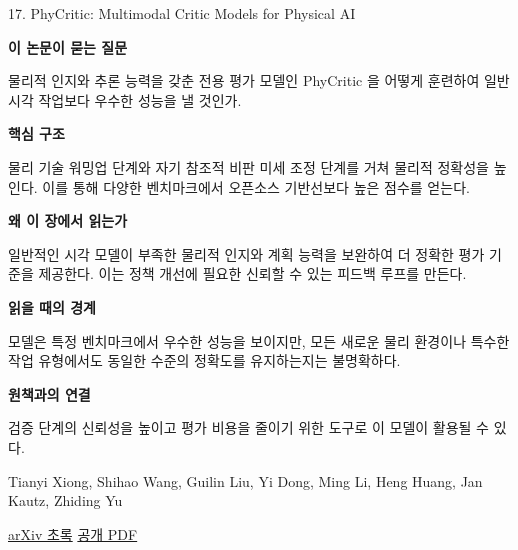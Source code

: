 \documentclass[11pt,openany]{book}
\begin{document}
\begin{termcard}{17. PhyCritic: Multimodal Critic Models for Physical AI}

\par

\medskip

{\sffamily\bfseries\color{deepblue} 이 논문이 묻는 질문}\par

물리적 인지와 추론 능력을 갖춘 전용 평가 모델인 PhyCritic 을 어떻게 훈련하여 일반 시각 작업보다 우수한 성능을 낼 것인가.

\smallskip

{\sffamily\bfseries\color{deepblue} 핵심 구조}\par

물리 기술 워밍업 단계와 자기 참조적 비판 미세 조정 단계를 거쳐 물리적 정확성을 높인다. 이를 통해 다양한 벤치마크에서 오픈소스 기반선보다 높은 점수를 얻는다.

\smallskip

{\sffamily\bfseries\color{deepblue} 왜 이 장에서 읽는가}\par

일반적인 시각 모델이 부족한 물리적 인지와 계획 능력을 보완하여 더 정확한 평가 기준을 제공한다. 이는 정책 개선에 필요한 신뢰할 수 있는 피드백 루프를 만든다.

\smallskip

{\sffamily\bfseries\color{coral} 읽을 때의 경계}\par

모델은 특정 벤치마크에서 우수한 성능을 보이지만, 모든 새로운 물리 환경이나 특수한 작업 유형에서도 동일한 수준의 정확도를 유지하는지는 불명확하다.

\smallskip

{\sffamily\bfseries\color{teal} 원책과의 연결}\par

검증 단계의 신뢰성을 높이고 평가 비용을 줄이기 위한 도구로 이 모델이 활용될 수 있다.

\medskip

{\footnotesize\color{muted} Tianyi Xiong, Shihao Wang, Guilin Liu, Yi Dong, Ming Li, Heng Huang, Jan Kautz, Zhiding Yu\par

\href{https://arxiv.org/abs/2602.11124}{arXiv 초록} \quad \href{https://arxiv.org/pdf/2602.11124}{공개 PDF}\par}

\end{termcard}
\end{document}
